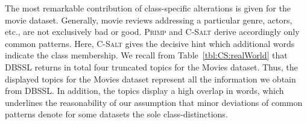 The most remarkable contribution of class-specific alterations is given for the movie dataset. Generally, movie reviews addressing a particular genre, actors, etc., are not exclusively bad or good. \textsc{Primp} and \textsc{C-Salt} derive accordingly only common patterns. Here, \textsc{C-Salt} gives the decisive hint which additional words indicate the class membership. We recall from Table~\ref{tbl:CS:realWorld} that \textsc{DBSSL} returns in total four truncated topics for the Movies dataset. Thus, the displayed topics for the Movies dataset represent all the information we obtain from \textsc{DBSSL}. In addition, the topics display a high overlap in words, which underlines the reasonability of our assumption that minor deviations of common patterns denote for some datasets the sole class-distinctions.  
